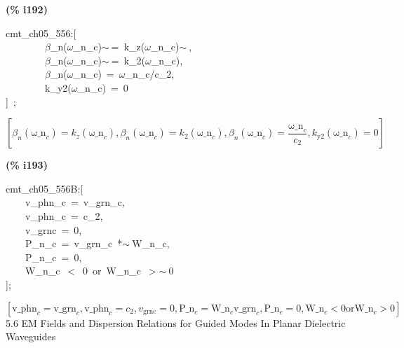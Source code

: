 \documentclass[fleqn]{article}
\begin{document}
\noindent
\begin{minipage}[t]{4.000000em}\color{red}\bfseries
(\% i192)	
\end{minipage}
\begin{minipage}[t]{\textwidth}\color{blue}
cmt\_ch05\_556:[\\
\ \ \ \ \ \ \ \ \ensuremath{\beta}\_n(\ensuremath{\omega}\_n\_c)\ensuremath{\sim\ }=\ k\_z(\ensuremath{\omega}\_n\_c)\ensuremath{\sim\ },\\
\ \ \ \ \ \ \ \ \ensuremath{\beta}\_n(\ensuremath{\omega}\_n\_c)\ensuremath{\sim\ }=\ k\_2(\ensuremath{\omega}\_n\_c),\\
\ \ \ \ \ \ \ \ \ensuremath{\beta}\_n(\ensuremath{\omega}\_n\_c)\ =\ \ensuremath{\omega}\_n\_c/c\_2,\\
\ \ \ \ \ \ \ \ k\_y2(\ensuremath{\omega}\_n\_c)\ =\ 0\\
]\ ;
\end{minipage}
\[\displaystyle \tag{\% o192} 
\left[ {{\beta }_n}\left( {{\ensuremath{\mathrm{\omega \_ n}}}_c}\right) ={k_z}\left( {{\ensuremath{\mathrm{\omega \_ n}}}_c}\right) \operatorname{,}{{\beta }_n}\left( {{\ensuremath{\mathrm{\omega \_ n}}}_c}\right) ={k_2}\left( {{\ensuremath{\mathrm{\omega \_ n}}}_c}\right) \operatorname{,}{{\beta }_n}\left( {{\ensuremath{\mathrm{\omega \_ n}}}_c}\right) =\frac{{{\ensuremath{\mathrm{\omega \_ n}}}_c}}{{c_2}}\operatorname{,}{k_{\ensuremath{\mathrm{y2}}}}\left( {{\ensuremath{\mathrm{\omega \_ n}}}_c}\right) =0\right] \mbox{}
\]


\noindent
\begin{minipage}[t]{4.000000em}\color{red}\bfseries
(\% i193)	
\end{minipage}
\begin{minipage}[t]{\textwidth}\color{blue}
cmt\_ch05\_556B:[\\
\ \ \ \ v\_phn\_c\ =\ v\_grn\_c,\\
\ \ \ \ v\_phn\_c\ =\ c\_2,\\
\ \ \ \ v\_grnc\ =\ 0,\\
\ \ \ \ P\_n\_c\ =\ v\_grn\_c\ *\ensuremath{\sim\ }W\_n\_c,\ \\
\ \ \ \ P\_n\_c\ =\ 0,\\
\ \ \ \ W\_n\_c\ \ensuremath{<}\ 0\ or\ W\_n\_c\ \ensuremath{>}\ensuremath{\sim\ }0\\
];
\end{minipage}
\[\displaystyle \tag{\% o193} 
\operatorname{[}{{\ensuremath{\mathrm{v\_ phn}}}_c}={{\ensuremath{\mathrm{v\_ grn}}}_c}\operatorname{,}{{\ensuremath{\mathrm{v\_ phn}}}_c}={c_2}\operatorname{,}{v_{\ensuremath{\mathrm{grnc}}}}=0\operatorname{,}{{\ensuremath{\mathrm{P\_ n}}}_c}={{\ensuremath{\mathrm{W\_ n}}}_c} {{\ensuremath{\mathrm{v\_ grn}}}_c}\operatorname{,}{{\ensuremath{\mathrm{P\_ n}}}_c}=0\operatorname{,}{{\ensuremath{\mathrm{W\_ n}}}_c}\operatorname{<  }0\ensuremath{\mathrm{ or }}{{\ensuremath{\mathrm{W\_ n}}}_c}\operatorname{>  }0\operatorname{]}\mbox{}
\]
5.6 EM Fields and Dispersion Relations for Guided Modes In Planar Dielectric Waveguides
\end{document}
